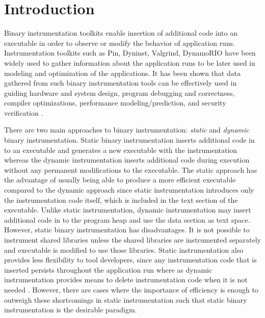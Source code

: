 \section{Introduction}

Binary instrumentation toolkits enable insertion of additional code into an
executable in order to observe or modify the behavior of application runs. 
Instrumentation toolkits such as Pin\cite{luk2005pin}, Dyninst\cite{buck2000api}, 
Valgrind\cite{nethercote2007valgrind}, DynamoRIO\cite{bruening2004efficient} have been widely used to gather information about the
application runs to be later used in modeling and optimization
of the applications. It has been shown that data gathered 
from such binary instrumentation tools can be effectively used in guiding hardware and
system design, program debugging and correctness, compiler optimizations,
performance modeling/prediction, and security verification \cite{snavely2001modeling}.

There are two main approaches to binary instrumentation: \textit{static} 
and \textit{dynamic} binary instrumentation. Static binary
instrumentation inserts additional code in to an executable and generates a new
executable with the instrumentation whereas the dynamic instrumentation inserts additional code 
during execution without any permanent modifications to the executable.
The static approach has the advantage of usually being able to produce
a more efficient executable compared to the dynamic approach
since static instrumentation introduces only the instrumentation code itself, 
which is included in the text section of the executable. 
Unlike static instrumentation, dynamic
instrumentation may insert additional code in to the program heap and use the data section as text space.
However, static binary instrumentation has disadvantages. It is not possible to instrument shared libraries 
unless the shared libraries are instrumented separately and executable is modified to use those libraries. 
Static instrumentation also provides less flexibility to tool developers, since any instrumentation code that is
inserted persists throughout the application run where as dynamic instrumentation 
provides means to delete instrumentation code when it is not needed \cite{tikir2002efficient}.
However, there are cases where the importance of efficiency is enough to outweigh
these shortcomings in static instrumentation \cite{carrington2006performance} such that static binary instrumentation is the
desirable paradigm.

